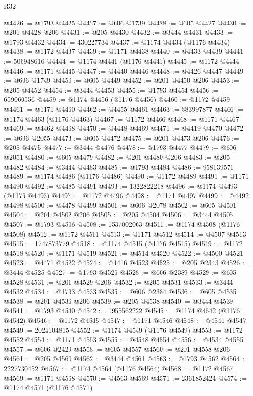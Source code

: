 \begin{lexlean}{R32}
\begin{coremodule}
@4426 := @1793 @4425
@4427 := @606 @1739
@4428 := @605 @4427
@4430 := @201 @4428 @206
@4431 := @205 @4430
@4432 := @3444 @4431
@4433 := @1793 @4432
@4434 := 430227734
@4437 := @1174 @4434 (@1176 @4434)
@4438 := @1172 @4437
@4439 := @1171 @4438
@4440 := @4433 @4439
@4441 := 506948616
@4444 := @1174 @4441 (@1176 @4441)
@4445 := @1172 @4444
@4446 := @1171 @4445
@4447 := @4440 @4446
@4448 := @4426 @4447
@4449 := @606 @1749
@4450 := @605 @4449
@4452 := @201 @4450 @206
@4453 := @205 @4452
@4454 := @3444 @4453
@4455 := @1793 @4454
@4456 := 659060556
@4459 := @1174 @4456 (@1176 @4456)
@4460 := @1172 @4459
@4461 := @1171 @4460
@4462 := @4455 @4461
@4463 := 883997877
@4466 := @1174 @4463 (@1176 @4463)
@4467 := @1172 @4466
@4468 := @1171 @4467
@4469 := @4462 @4468
@4470 := @4448 @4469
@4471 := @4419 @4470
@4472 := @606 @2055
@4473 := @605 @4472
@4475 := @201 @4473 @206
@4476 := @205 @4475
@4477 := @3444 @4476
@4478 := @1793 @4477
@4479 := @606 @2051
@4480 := @605 @4479
@4482 := @201 @4480 @206
@4483 := @205 @4482
@4484 := @3444 @4483
@4485 := @1793 @4484
@4486 := 958139571
@4489 := @1174 @4486 (@1176 @4486)
@4490 := @1172 @4489
@4491 := @1171 @4490
@4492 := @4485 @4491
@4493 := 1322822218
@4496 := @1174 @4493 (@1176 @4493)
@4497 := @1172 @4496
@4498 := @1171 @4497
@4499 := @4492 @4498
@4500 := @4478 @4499
@4501 := @606 @2078
@4502 := @605 @4501
@4504 := @201 @4502 @206
@4505 := @205 @4504
@4506 := @3444 @4505
@4507 := @1793 @4506
@4508 := 1537002063
@4511 := @1174 @4508 (@1176 @4508)
@4512 := @1172 @4511
@4513 := @1171 @4512
@4514 := @4507 @4513
@4515 := 1747873779
@4518 := @1174 @4515 (@1176 @4515)
@4519 := @1172 @4518
@4520 := @1171 @4519
@4521 := @4514 @4520
@4522 := @4500 @4521
@4523 := @4471 @4522
@4524 := @4416 @4523
@4525 := @205 @2343
@4526 := @3444 @4525
@4527 := @1793 @4526
@4528 := @606 @2389
@4529 := @605 @4528
@4531 := @201 @4529 @206
@4532 := @205 @4531
@4533 := @3444 @4532
@4534 := @1793 @4533
@4535 := @606 @2384
@4536 := @605 @4535
@4538 := @201 @4536 @206
@4539 := @205 @4538
@4540 := @3444 @4539
@4541 := @1793 @4540
@4542 := 1955562222
@4545 := @1174 @4542 (@1176 @4542)
@4546 := @1172 @4545
@4547 := @1171 @4546
@4548 := @4541 @4547
@4549 := 2024104815
@4552 := @1174 @4549 (@1176 @4549)
@4553 := @1172 @4552
@4554 := @1171 @4553
@4555 := @4548 @4554
@4556 := @4534 @4555
@4557 := @606 @2429
@4558 := @605 @4557
@4560 := @201 @4558 @206
@4561 := @205 @4560
@4562 := @3444 @4561
@4563 := @1793 @4562
@4564 := 2227730452
@4567 := @1174 @4564 (@1176 @4564)
@4568 := @1172 @4567
@4569 := @1171 @4568
@4570 := @4563 @4569
@4571 := 2361852424
@4574 := @1174 @4571 (@1176 @4571)

\end{coremodule}
\end{lexlean}
